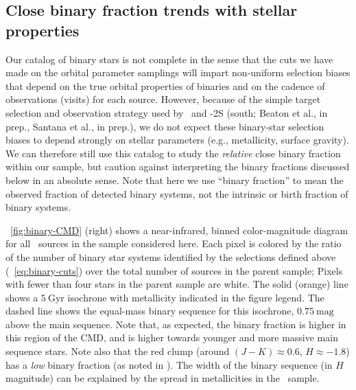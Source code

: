 \documentclass[modern]{aastex63}
\begin{document}
\subsection{Close binary fraction trends with stellar properties}
\label{sec:binary-fraction}

Our catalog of binary stars is not complete in the sense that the cuts we have
made on the orbital parameter samplings will impart non-uniform selection biases
that depend on the true orbital properties of binaries and on the cadence of
observations (visits) for each source.
However, because of the simple target selection and observation strategy used by
\apogee\, \citep{Zasowski:2013, Zasowski:2017} and \apogee-2S (south; Beaton et
al., in prep., Santana et al., in prep.), we do not expect these binary-star
selection biases to depend strongly on stellar parameters (e.g., metallicity,
surface gravity).
We can therefore still use this catalog to study the \emph{relative} close
binary fraction within our sample, but caution against interpreting the binary
fractions discussed below in an absolute sense.
Note that here we use ``binary fraction'' to mean the observed fraction of
detected binary systems, not the intrinsic or birth fraction of binary systems.

\figurename~\ref{fig:binary-CMD} (right) shows a near-infrared, binned
color-magnitude diagram for all \apogee\ sources in the sample considered here.
Each pixel is colored by the ratio of the number of binary star systems
identified by the selections defined above (\equationname~\ref{eq:binary-cuts})
over the total number of sources in the parent sample; Pixels with fewer than
four stars in the parent sample are white.
The solid (orange) line shows a $5~\mathrm{Gyr}$  isochrone
\cite{Dotter:2016, Choi:2016, Paxton:2011, Paxton:2013, Paxton:2015} with
metallicity indicated in the figure legend.
The dashed line shows the equal-mass binary sequence for this isochrone,
$0.75~\mathrm{mag}$ above the main sequence.
Note that, as expected, the binary fraction is higher in this region of the CMD,
and is higher towards younger and more massive main sequence stars.
Note also that the red clump (around $(J-K) \approx 0.6$, $H \approx -1.8$) has
a \emph{low} binary fraction (as noted in \citealt{Badenes:2018}).
The width of the binary sequence (in $H$ magnitude) can be explained by the
spread in metallicities in the \apogee\ sample.
\end{document}
